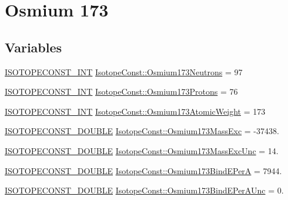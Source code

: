 \hypertarget{group___isotope_const-_osmium-_os173}{}\section{Osmium 173}
\label{group___isotope_const-_osmium-_os173}
\subsection*{Variables}
\begin{DoxyCompactItemize}
\item 
\mbox{\hyperlink{group___isotope_const-_macros_ga5f18360b3e99483a35c32d789e62621c}{I\+S\+O\+T\+O\+P\+E\+C\+O\+N\+S\+T\+\_\+\+I\+NT}} \mbox{\hyperlink{group___isotope_const-_osmium-_os173_gabe61b53542ee348850fc5208d8712a59}{Isotope\+Const\+::\+Osmium173\+Neutrons}} = 97
\item 
\mbox{\hyperlink{group___isotope_const-_macros_ga5f18360b3e99483a35c32d789e62621c}{I\+S\+O\+T\+O\+P\+E\+C\+O\+N\+S\+T\+\_\+\+I\+NT}} \mbox{\hyperlink{group___isotope_const-_osmium-_os173_gad1babe99c95fa21ae2cb068de69795e3}{Isotope\+Const\+::\+Osmium173\+Protons}} = 76
\item 
\mbox{\hyperlink{group___isotope_const-_macros_ga5f18360b3e99483a35c32d789e62621c}{I\+S\+O\+T\+O\+P\+E\+C\+O\+N\+S\+T\+\_\+\+I\+NT}} \mbox{\hyperlink{group___isotope_const-_osmium-_os173_ga56970c652db4fbc6ed8ee95caa9b4833}{Isotope\+Const\+::\+Osmium173\+Atomic\+Weight}} = 173
\item 
\mbox{\hyperlink{group___isotope_const-_macros_ga8f45a7272ce02c0b4c65c44636ed719a}{I\+S\+O\+T\+O\+P\+E\+C\+O\+N\+S\+T\+\_\+\+D\+O\+U\+B\+LE}} \mbox{\hyperlink{group___isotope_const-_osmium-_os173_gaa5de3a50406bd65f1e6b035fab9b1161}{Isotope\+Const\+::\+Osmium173\+Mass\+Exc}} = -\/37438.
\item 
\mbox{\hyperlink{group___isotope_const-_macros_ga8f45a7272ce02c0b4c65c44636ed719a}{I\+S\+O\+T\+O\+P\+E\+C\+O\+N\+S\+T\+\_\+\+D\+O\+U\+B\+LE}} \mbox{\hyperlink{group___isotope_const-_osmium-_os173_gad496fb6f13e34f5fa27d96afaca92fe8}{Isotope\+Const\+::\+Osmium173\+Mass\+Exc\+Unc}} = 14.
\item 
\mbox{\hyperlink{group___isotope_const-_macros_ga8f45a7272ce02c0b4c65c44636ed719a}{I\+S\+O\+T\+O\+P\+E\+C\+O\+N\+S\+T\+\_\+\+D\+O\+U\+B\+LE}} \mbox{\hyperlink{group___isotope_const-_osmium-_os173_ga72ab0845d738e32511a14061c8e32522}{Isotope\+Const\+::\+Osmium173\+Bind\+E\+PerA}} = 7944.
\item 
\mbox{\hyperlink{group___isotope_const-_macros_ga8f45a7272ce02c0b4c65c44636ed719a}{I\+S\+O\+T\+O\+P\+E\+C\+O\+N\+S\+T\+\_\+\+D\+O\+U\+B\+LE}} \mbox{\hyperlink{group___isotope_const-_osmium-_os173_ga1e514e87e646973a1707828df7705d76}{Isotope\+Const\+::\+Osmium173\+Bind\+E\+Per\+A\+Unc}} = 0.

\end{DoxyCompactItemize}
